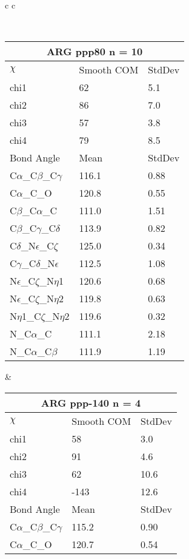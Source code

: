\newpage

\begin{longtable}{ c c }

\caption{ARG Central Values}\\
  \begin{tabular}{ l l l }
  \toprule
  \multicolumn{3}{c}{ARG \textbf{ppp80} n = 10} \\ \toprule
  $\chi$       & Smooth COM & StdDev \\ \midrule
  chi1 & 62 & 5.1 \\ 
  chi2 & 86 & 7.0 \\ 
  chi3 & 57 & 3.8 \\ 
  chi4 & 79 & 8.5 \\ \midrule
  Bond Angle   & Mean     & StdDev \\ \midrule
  C$\alpha$\_C$\beta$\_C$\gamma$ & 116.1 & 0.88\\
  C$\alpha$\_C\_O & 120.8 & 0.55\\
  C$\beta$\_C$\alpha$\_C & 111.0 & 1.51\\
  C$\beta$\_C$\gamma$\_C$\delta$ & 113.9 & 0.82\\
  C$\delta$\_N$\epsilon$\_C$\zeta$ & 125.0 & 0.34\\
  C$\gamma$\_C$\delta$\_N$\epsilon$ & 112.5 & 1.08\\
  N$\epsilon$\_C$\zeta$\_N$\eta$1 & 120.6 & 0.68\\
  N$\epsilon$\_C$\zeta$\_N$\eta$2 & 119.8 & 0.63\\
  N$\eta$1\_C$\zeta$\_N$\eta$2 & 119.6 & 0.32\\
  N\_C$\alpha$\_C & 111.1 & 2.18\\
  N\_C$\alpha$\_C$\beta$ & 111.9 & 1.19\\
  \bottomrule
  \end{tabular}
  &
  \begin{tabular}{ l l l }
  \toprule
  \multicolumn{3}{c}{ARG \textbf{ppp-140} n = 4} \\ \toprule
  $\chi$       & Smooth COM & StdDev \\ \midrule
  chi1 & 58 & 3.0 \\ 
  chi2 & 91 & 4.6 \\ 
  chi3 & 62 & 10.6 \\ 
  chi4 & -143 & 12.6 \\ \midrule
  Bond Angle   & Mean     & StdDev \\ \midrule
  C$\alpha$\_C$\beta$\_C$\gamma$ & 115.2 & 0.90\\
  C$\alpha$\_C\_O & 120.7 & 0.54\\

\end{tabular}
\end{longtable}
